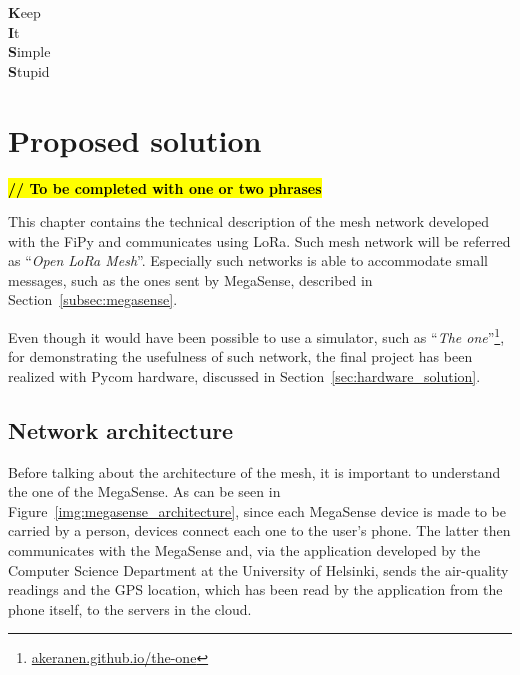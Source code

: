 
\begin{savequote}[40mm]
	\textbf{K}eep\\
	\textbf{I}t\\
	\textbf{S}imple\\
	\textbf{S}tupid
\end{savequote}

\chapter{Proposed solution}\label{chapter:proposed_solution}
	
	\textbf{\textcolor{red}{\hl{// To be completed with one or two phrases}}}

	This chapter contains the technical description of the mesh network developed with the FiPy and communicates using LoRa.
	Such mesh network will be referred as ``\textit{Open LoRa Mesh}''.
	Especially such networks is able to accommodate small messages, such as the ones sent by MegaSense, described in Section~\ref{subsec:megasense}.

	Even though it would have been possible to use a simulator, such as ``\textit{The one}''\footnote{ \url{akeranen.github.io/the-one}}, for demonstrating the usefulness of such network, the final project has been realized with Pycom hardware, discussed in Section~\ref{sec:hardware_solution}.
	
	
	\section{Network architecture}\label{sec:architecture}
		
		Before talking about the architecture of the mesh, it is important to understand the one of the MegaSense.
		As can be seen in Figure~\ref{img:megasense_architecture}, since each MegaSense device is made to be carried by a person, devices connect each one to the user's phone.
		The latter then communicates with the MegaSense and, via the application developed by the Computer Science Department at the University of Helsinki, sends the air-quality readings and the GPS location, which has been read by the application from the phone itself, to the servers in the cloud.
		
